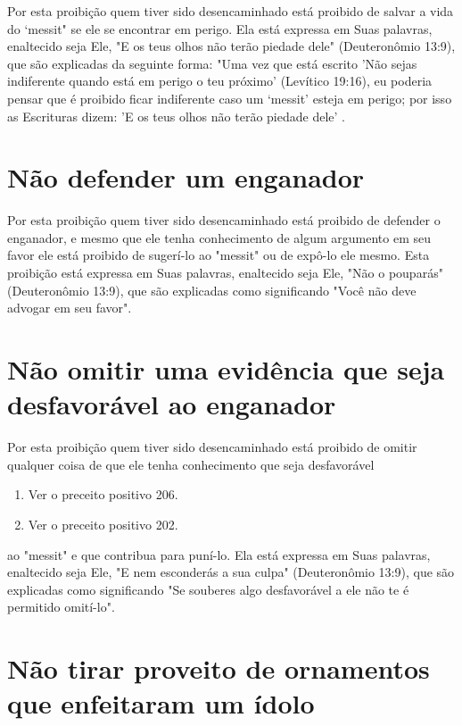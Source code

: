 \begin{itemize}
\begin{enumrate}
\begin{itemize}
\begin{itemize}
\begin{itemize}
Por esta proibição quem tiver sido desencaminhado está proibido de
salvar a vida do `messit" se ele se encontrar em perigo. Ela está
expressa em Suas palavras, enaltecido seja Ele, "E os teus olhos não
terão piedade dele" (Deuteronômio 13:9), que são explicadas da seguinte
forma: "Uma vez que es­tá escrito 'Não sejas indiferente quando está em
perigo o teu próximo' (Levíti­co 19:16), eu poderia pensar que é
proibido ficar indiferente caso um `messit' esteja em perigo; por isso
as Escrituras dizem: 'E os teus olhos não terão pieda­de dele' .

\section{Não defender um enganador}

Por esta proibição quem tiver sido desencaminhado está proibido de
defender o enganador, e mesmo que ele tenha conhecimento de algum
ar­gumento em seu favor ele está proibido de sugerí-lo ao "messit" ou de
expô-lo ele mesmo. Esta proibição está expressa em Suas palavras,
enaltecido seja Ele, "Não o pouparás" (Deuteronômio 13:9), que são
explicadas como significan­do "Você não deve advogar em seu favor".

\section{Não omitir uma evidência que seja desfavorável ao enganador}

Por esta proibição quem tiver sido desencaminhado está proibido de
omitir qualquer coisa de que ele tenha conhecimento que seja
desfavorável


\begin{enumerate}
\def\labelenumi{\arabic{enumi}.}
\setcounter{enumi}{241}
\item
 
 Ver o preceito positivo 206.
 
\item
 
 Ver o preceito positivo 202.
 
\end{enumerate}

ao "messit" e que contribua para puní-lo. Ela está expressa em Suas
palavras, enaltecido seja Ele, "E nem esconderás a sua culpa"
(Deuteronômio 13:9), que são explicadas como significando "Se souberes
algo desfavorável a ele não te é permitido omití-lo".

\section{Não tirar proveito de ornamentos que enfeitaram um ídolo}


\end{itemize}
\end{itemize}
\end{itemize}
\end{enumrate}
\end{itemize}
